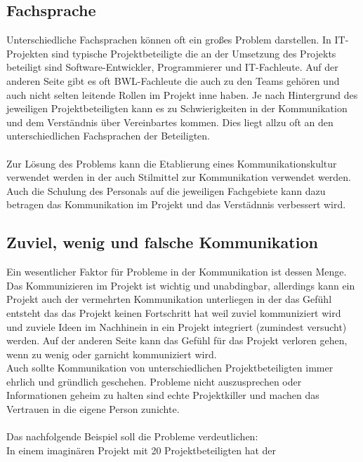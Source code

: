 \documentclass[11pt]{scrartcl}
\begin{document}
\subsection{Fachsprache}
Unterschiedliche Fachsprachen können oft ein großes Problem darstellen. In IT-Projekten sind typische Projektbeteiligte die an der Umsetzung des Projekts beteiligt sind Software-Entwickler, Programmierer und IT-Fachleute. Auf der anderen Seite gibt es oft BWL-Fachleute die auch zu den Teams gehören und auch nicht selten leitende Rollen im Projekt inne haben. Je nach Hintergrund des jeweiligen Projektbeteiligten kann es zu Schwierigkeiten in der Kommunikation und dem Verständnis über Vereinbartes kommen. Dies liegt allzu oft an den unterschiedlichen Fachsprachen der Beteiligten. \\
\\
Zur Lösung des Problems kann die Etablierung eines Kommunikationskultur verwendet werden in der auch Stilmittel zur Kommunikation verwendet werden. Auch die Schulung des Personals auf die jeweiligen Fachgebiete kann dazu betragen das Kommunikation im Projekt und das Verstädnnis verbessert wird. 

\subsection{Zuviel, wenig und falsche Kommunikation}
Ein wesentlicher Faktor für Probleme in der Kommunikation ist dessen Menge. Das Kommunizieren im Projekt ist wichtig und unabdingbar, allerdings kann ein Projekt auch der vermehrten Kommunikation unterliegen in der das Gefühl entsteht das das Projekt keinen Fortschritt hat weil zuviel kommuniziert wird und zuviele Ideen im Nachhinein in ein Projekt integriert (zumindest versucht) werden. Auf der anderen Seite kann das Gefühl für das Projekt verloren gehen, wenn zu wenig oder garnicht kommuniziert wird.\\ Auch sollte Kommunikation von unterschiedlichen Projektbeteiligten immer ehrlich und gründlich geschehen. Probleme nicht auszusprechen oder Informationen geheim zu halten sind echte Projektkiller und machen das Vertrauen in die eigene Person zunichte.\\
\\
Das nachfolgende Beispiel soll die Probleme verdeutlichen:\\
In einem imaginären Projekt mit 20 Projektbeteiligten hat der 
\\
\cite{profPM}
\cite{scriptPM}
\cite{chaosReportCriteria}
\end{document}

